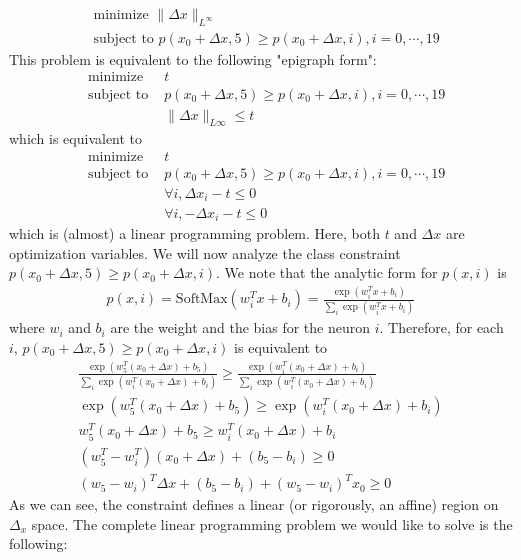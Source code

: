 \documentclass[
	12pt, %
]{../Template/fphw}
\begin{document}
\begin{enumerate}[label = (\arabic*)]
\begin{align}
        &\textrm{minimize } \|\Delta x\|_{L^\infty} \\
        &\textrm{subject to } p(x_0+\Delta x, 5) \geq p(x_0+\Delta x, i), i=0,\cdots ,19 \label{eqn: max_constraint}
    \end{align}
    This problem is equivalent to the following "epigraph form":
        \begin{align}
        &\textrm{minimize } &t \\
        &\textrm{subject to } &p(x_0+\Delta x, 5) \geq p(x_0+\Delta x, i), i=0,\cdots ,19  \\
        & & \|\Delta x\|_{L\infty}\leq t
    \end{align}
    which is equivalent to
    \begin{align}
        &\textrm{minimize } &t \\
        &\textrm{subject to } &p(x_0+\Delta x, 5) \geq p(x_0+\Delta x, i), i=0,\cdots ,19  \\
        & & \forall i, \Delta x_i -t \leq 0\\
        & & \forall i, -\Delta x_i -t \leq 0
    \end{align}
    which is (almost) a linear programming problem. Here, both $t$ and $\Delta x$ are optimization variables. We will now analyze the class constraint $p(x_0+\Delta x, 5) \geq p(x_0+\Delta x, i)$. We note that the analytic form for $p(x,i)$ is
    \begin{align}
        p(x,i) = \textrm{SoftMax}(w^T_ix+b_i) = \frac{\exp(w^T_ix+b_i)}{\sum_{i}\exp(w^T_ix+b_i)}
    \end{align}
    where $w_i$ and $b_i$ are the weight and the bias for the neuron $i$. Therefore, for each $i$, $p(x_0+\Delta x,5)\geq p(x_0+\Delta x, i)$ is equivalent to
    \begin{align}
        \frac{\exp(w^T_5(x_0+\Delta x)+b_5)}{\sum_{i}\exp(w^T_i(x_0+\Delta x)+b_i)} \geq \frac{\exp(w^T_i(x_0+\Delta x)+b_i)}{\sum_{i}\exp(w^T_i(x_0+\Delta x)+b_i)} \\
        \exp(w^T_5(x_0+\Delta x)+b_5) \geq\exp(w^T_i(x_0+\Delta x)+b_i) \\
        w^T_5(x_0+\Delta x)+b_5 \geq w^T_i(x_0+\Delta x)+b_i \\
        (w^T_5-w^T_i)(x_0+\Delta x)+(b_5-b_i)\geq 0 \\
        (w_5-w_i)^T \Delta x + (b_5-b_i) + (w_5-w_i)^Tx_0 \geq 0
    \end{align}
    As we can see, the constraint defines a linear (or rigorously, an affine) region on $\Delta_x$ space. The complete linear programming problem we would like to solve is the following:

\end{enumerate}
\end{document}

